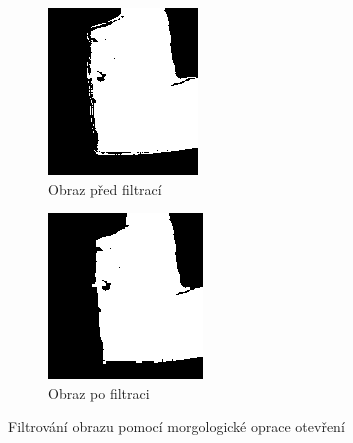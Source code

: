 \documentclass[twoside]{ctuthesis}
\begin{document}
\begin{figure}
    \centering
    \begin{subfigure}{0.4\textwidth}
      \centering
      \includegraphics[width=0.93\linewidth]{pictures/before_open.png}
      \caption{Obraz před filtrací}
      \label{subfig:pic_close}
    \end{subfigure}
    \begin{subfigure}{0.39\textwidth}
      \centering
      \includegraphics[width=0.99\linewidth]{pictures/after_open.png}
      \caption{Obraz po filtraci}
      \label{subfig:pic_open}
    \end{subfigure}
    \caption{Filtrování obrazu pomocí morgologické oprace otevření}
    \label{fig:morfology_open}
\end{figure}
\end{document}
